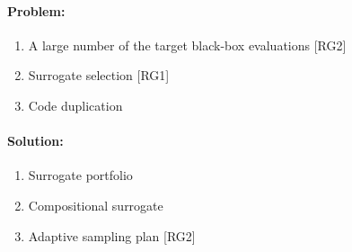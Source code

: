         \paragraph{Problem:}
        \begin{enumerate}
            \item A large number of the target black-box evaluations [RG2]
            \item Surrogate selection [RG1]
            \item Code duplication
        \end{enumerate}

        \paragraph{Solution:}
        \begin{enumerate}
            \item Surrogate portfolio
            \item Compositional surrogate 
            \item Adaptive sampling plan [RG2]
        \end{enumerate}









